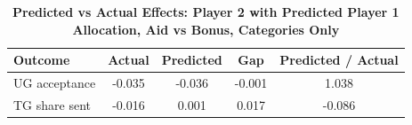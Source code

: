 \begin{table}[!htbp]
\centering
\caption{\textbf{Predicted vs Actual Effects: Player 2 with Predicted Player 1 Allocation, Aid vs Bonus, Categories Only}}
\label{tab:cats_only_aid_vs_bonus_predsender_fullpooled_p2_fit}
\begin{tabular}{lcccc}
\toprule
Outcome & Actual & Predicted & Gap & Predicted / Actual \\
\midrule
UG acceptance & -0.035 & -0.036 & -0.001 & 1.038 \\
TG share sent & -0.016 & 0.001 & 0.017 & -0.086 \\
\bottomrule
\end{tabular}
\end{table}
